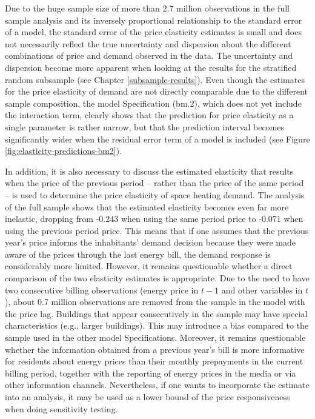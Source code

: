 \documentclass[12pt,twoside]{reedthesis}
\begin{document}
Due to the huge sample size of more than 2.7 million observations in the full sample analysis and its inversely proportional relationship to the standard error of a model, the standard error of the price elasticity estimates is small and does not necessarily reflect the true uncertainty and dispersion about the different combinations of price and demand observed in the data. The uncertainty and dispersion become more apparent when looking at the results for the stratified random subsample (see Chapter \ref{subsample-results}). Even though the estimates for the price elasticity of demand are not directly comparable due to the different sample composition, the model Specification (bm.2), which does not yet include the interaction term, clearly shows that the prediction for price elasticity as a single parameter is rather narrow, but that the prediction interval becomes significantly wider when the residual error term of a model is included (see Figure \ref{fig:elasticity-predictions-bm2}).

In addition, it is also necessary to discuss the estimated elasticity that results when the price of the previous period -- rather than the price of the same period -- is used to determine the price elasticity of space heating demand. The analysis of the full sample shows that the estimated elasticity becomes even far more inelastic, dropping from -0.243 when using the same period price to -0.071 when using the previous period price. This means that if one assumes that the previous year's price informs the inhabitants' demand decision because they were made aware of the prices through the last energy bill, the demand response is considerably more limited. However, it remains questionable whether a direct comparison of the two elasticity estimates is appropriate. Due to the need to have two consecutive billing observations (energy price in \(t-1\) and other variables in \(t\)), about 0.7 million observations are removed from the sample in the model with the price lag. Buildings that appear consecutively in the sample may have special characteristics (e.g., larger buildings). This may introduce a bias compared to the sample used in the other model Specifications. Moreover, it remains questionable whether the information obtained from a previous year's bill is more informative for residents about energy prices than their monthly prepayments in the current billing period, together with the reporting of energy prices in the media or via other information channels. Nevertheless, if one wants to incorporate the estimate into an analysis, it may be used as a lower bound of the price responsiveness when doing sensitivity testing.
\end{document}
